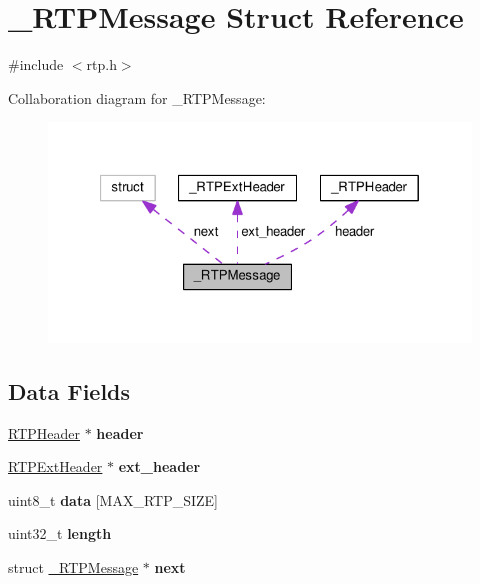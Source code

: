 \hypertarget{struct___r_t_p_message}{\section{\+\_\+\+R\+T\+P\+Message Struct Reference}
\label{struct___r_t_p_message}
}


{\ttfamily \#include $<$rtp.\+h$>$}



Collaboration diagram for \+\_\+\+R\+T\+P\+Message\+:\nopagebreak
\begin{figure}[H]
\begin{center}
\leavevmode
\includegraphics[width=321pt]{struct___r_t_p_message__coll__graph}
\end{center}
\end{figure}
\subsection*{Data Fields}
\begin{DoxyCompactItemize}
\item 
\hypertarget{struct___r_t_p_message_afa0aee0d9eab5781c753943ec6a37584}{\hyperlink{struct___r_t_p_header}{R\+T\+P\+Header} $\ast$ {\bfseries header}}\label{struct___r_t_p_message_afa0aee0d9eab5781c753943ec6a37584}

\item 
\hypertarget{struct___r_t_p_message_aa0a69d899b1bee283ae1490f53bcd073}{\hyperlink{struct___r_t_p_ext_header}{R\+T\+P\+Ext\+Header} $\ast$ {\bfseries ext\+\_\+header}}\label{struct___r_t_p_message_aa0a69d899b1bee283ae1490f53bcd073}

\item 
\hypertarget{struct___r_t_p_message_a89f8083b50c7cef74e96797bb74f8757}{uint8\+\_\+t {\bfseries data} \mbox{[}M\+A\+X\+\_\+\+R\+T\+P\+\_\+\+S\+I\+Z\+E\mbox{]}}\label{struct___r_t_p_message_a89f8083b50c7cef74e96797bb74f8757}

\item 
\hypertarget{struct___r_t_p_message_aebb70c2aab3407a9f05334c47131a43b}{uint32\+\_\+t {\bfseries length}}\label{struct___r_t_p_message_aebb70c2aab3407a9f05334c47131a43b}

\item 
\hypertarget{struct___r_t_p_message_af02d4bf6724c59e5df90bacdfc8a8499}{struct \hyperlink{struct___r_t_p_message}{\+\_\+\+R\+T\+P\+Message} $\ast$ {\bfseries next}}\label{struct___r_t_p_message_af02d4bf6724c59e5df90bacdfc8a8499}

\end{DoxyCompactItemize}


